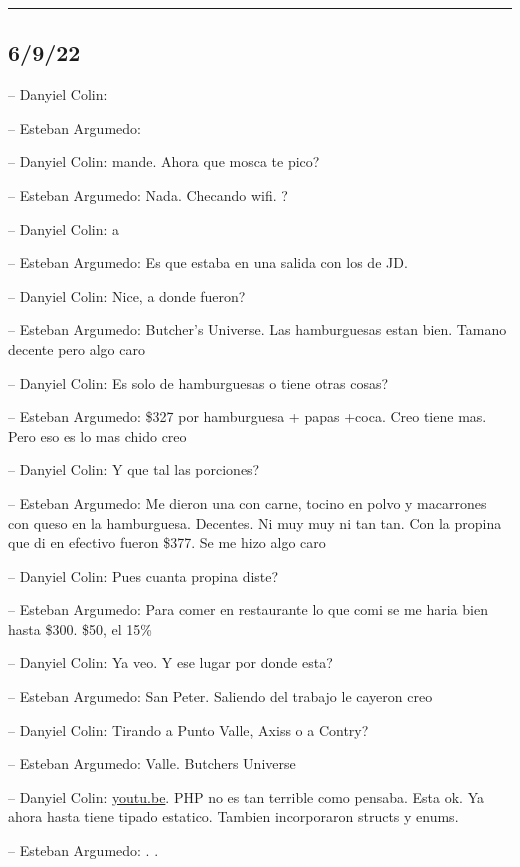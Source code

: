 \begin{center}\rule{0.5\linewidth}{0.5pt}\end{center}

\hypertarget{section-98}{%
\subsection{6/9/22}\label{section-98}}

-- Danyiel Colin:

-- Esteban Argumedo:

-- Danyiel Colin: mande. Ahora que mosca te pico?

-- Esteban Argumedo: Nada. Checando wifi. ?

-- Danyiel Colin: a

-- Esteban Argumedo: Es que estaba en una salida con los de JD.

-- Danyiel Colin: Nice, a donde fueron?

-- Esteban Argumedo: Butcher's Universe. Las hamburguesas estan bien.
Tamano decente pero algo caro

-- Danyiel Colin: Es solo de hamburguesas o tiene otras cosas?

-- Esteban Argumedo: \$327 por hamburguesa + papas +coca. Creo tiene
mas. Pero eso es lo mas chido creo

-- Danyiel Colin: Y que tal las porciones?

-- Esteban Argumedo: Me dieron una con carne, tocino en polvo y
macarrones con queso en la hamburguesa. Decentes. Ni muy muy ni tan tan.
Con la propina que di en efectivo fueron \$377. Se me hizo algo caro

-- Danyiel Colin: Pues cuanta propina diste?

-- Esteban Argumedo: Para comer en restaurante lo que comi se me haria
bien hasta \$300. \$50, el 15\%

-- Danyiel Colin: Ya veo. Y ese lugar por donde esta?

-- Esteban Argumedo: San Peter. Saliendo del trabajo le cayeron creo

-- Danyiel Colin: Tirando a Punto Valle, Axiss o a Contry?

-- Esteban Argumedo: Valle. Butchers Universe

-- Danyiel Colin: \href{https://youtu.be/hLOmKVpZq00}{youtu.be}. PHP no
es tan terrible como pensaba. Esta ok. Ya ahora hasta tiene tipado
estatico. Tambien incorporaron structs y enums.

-- Esteban Argumedo: . .

